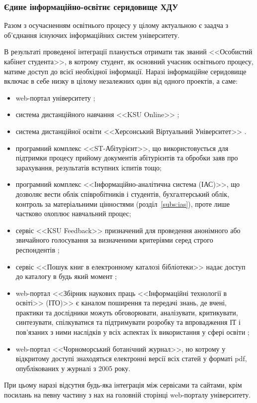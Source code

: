 \subsubsection{Єдине інформаційно-освітнє серидовище ХДУ}

Разом з осучасненням освітнього процесу у цілому актуальною є заадча з об'єднання існуючих інформаційних систем університету.

В результаті проведеної інтеграції планується отримати так званий <<Особистий кабінет студента>>, в котрому студент, як основний учасник освітнього процесу, матиме доступ до всієї необхідної інформації. Наразі інформаційне серидовище включає в себе низку в цілому незалежних один від одного проектів, а саме:
\begin{itemize}
	\item web-портал університету \cite{KspuEdu};
	\item система дистанційного навчання <<KSU Online>> \cite{KsuOnline};
	\item система дистанційної освіти <<Херсонський Віртуальний Університет>> \cite{KsuDis}.
	\item програмний комплекс <<ST-Абітурієнт>>, що використовується для підтримки процесу прийому документів абітурієнтів та обробки заяв про зарахування, результатів вступних іспитів тощо;
	\item програмний комплекс <<Інформаційно-аналітична система (ІАС)>>, що дозволяє вести облік співробітників і студентів, бухгалтерський облік, контроль за матеріальними цінностями (розділ~\ref{subs:ias}), проте лише частково охоплює навчальний процес;
	\item сервіс <<KSU Feedback>> призначений для проведення анонімного або звичайного голосування за визначеними критеріями серед строго респондентів \cite{KsuFeedback};
	\item сервіс  <<Пошук книг в електронному каталозі бібліотеки>> надає доступ до каталогу в будь який момент \cite{eLibrary};
	\item web-портал <<Збірник наукових праць <<Інформаційні технології в освіті>> (ІТО)>> є каналом поширення та передачі знань, де вчені, практики та дослідники можуть обговорювати, аналізувати, критикувати, синтезувати, спілкуватися та підтримувати розробку та впровадження ІТ і пов'язаних з ними наслідків у всіх аспектах їх використання у сфері освіти \cite{ITO};
	\item web-портал <<Чорноморський ботанiчний журнал>>, но котрому у відкритому доступі знаходяться електронні версії всіх статей у форматі pdf, опублікованих у журналі з 2005 року.
\end{itemize}

При цьому наразі відсутня будь-яка інтеграція між сервісами та сайтами, крім посилань на певну частину з нах на головній сторінці web-порталу університету.
